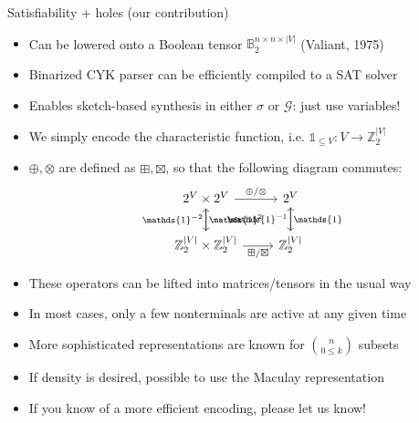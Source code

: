 \documentclass{beamer}
\begin{document}
    \begin{frame}[fragile]{Satisfiability + holes (our contribution)}
        \begin{itemize}
            \item Can be lowered onto a Boolean tensor $\mathbb{B}_2^{n\times n \times |V|}$ (Valiant, 1975)
            \item Binarized CYK parser can be efficiently compiled to a SAT solver
            \item Enables sketch-based synthesis in either $\sigma$ or $\mathcal G$: just use variables!
            \item We simply encode the characteristic function, i.e. $\mathds{1}_{\subseteq V}: V\rightarrow \mathbb{Z}_2^{|V|}$
            \item $\oplus, \otimes$ are defined as $\boxplus, \boxtimes$, so that the following diagram commutes:
            \[\begin{tikzcd}
                  2^V \times 2^V \arrow[r, "\oplus/\otimes"] \arrow[d, "\mathds{1}^2"]
                  & 2^V \arrow[d, "\mathds{1}\phantom{^{-1}}"] \\
                  \mathbb{Z}_2^{|V|} \times \mathbb{Z}_2^{|V|} \arrow[r, "\boxplus/\boxtimes", labels=below] \arrow[u, "\mathds{1}^{-2}"]
                  & \mathbb{Z}_2^{|V|} \arrow[u, "\mathds{1}^{-1}"]
            \end{tikzcd}\]
            \item These operators can be lifted into matrices/tensors in the usual way
            \item In most cases, only a few nonterminals are active at any given time
            \item More sophisticated representations are known for $\binom{n}{0 \leq k}$ subsets
            \item If density is desired, possible to use the Maculay representation
            \item If you know of a more efficient encoding, please let us know!
        \end{itemize}
    \end{frame}
\end{document}
